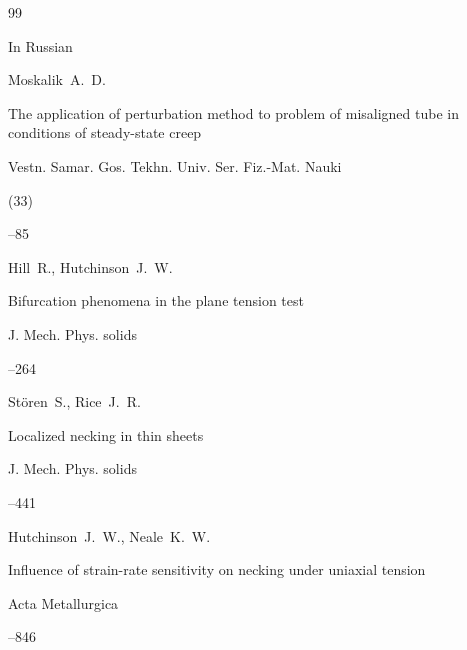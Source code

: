 \begin{thebibliography}{99}

\lang In Russian


\by Moskalik~A.~D.

\paper The application of perturbation method to problem of misaligned tube in conditions of steady-state creep

\jour Vestn. Samar. Gos. Tekhn. Univ. Ser. Fiz.-Mat. Nauki


(33)

--85






\by Hill~R., Hutchinson~J.~W.

\paper Bifurcation phenomena in the plane tension test

\jour J. Mech. Phys. solids



--264






\by St\"oren~S., Rice~J.~R.

\paper Localized necking in thin sheets

\jour J. Mech. Phys. solids




--441






\by Hutchinson~J.~W., Neale~K.~W.

\paper Influence of strain-rate sensitivity on necking under uniaxial tension 

\jour Acta Metallurgica




--846


\end{thebibliography}
